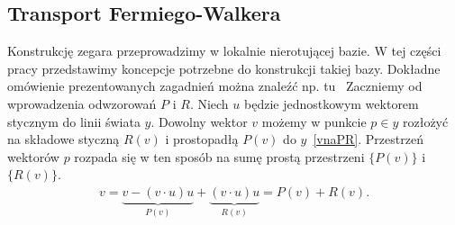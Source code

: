 \subsection{Transport Fermiego-Walkera}
Konstrukcję zegara przeprowadzimy w lokalnie nierotującej bazie. W tej części
pracy przedstawimy koncepcje potrzebne do konstrukcji takiej bazy. Dokładne 
omówienie prezentowanych zagadnień można znaleźć np. 
tu~\cite{synge1960, FWframesconstruct}
Zaczniemy od wprowadzenia odwzorowań $P$ i $R$. Niech $u$ będzie jednostkowym
wektorem stycznym do linii świata $y$. Dowolny wektor $v$ możemy w punkcie 
$p\in y$ rozłożyć na składowe styczną $R(v)$ i prostopadłą $P(v)$ 
do $y$~\eqref{vnaPR}. Przestrzeń wektorów $p$ rozpada się w ten sposób 
na sumę prostą przestrzeni $\{P(v)\}$ i $\{R(v)\}$.
\begin{align}\label{vnaPR}
v = \underbrace{v - (v\cdot u) u}_{P(v)} + 
\underbrace{(v\cdot u)u}_{R(v)} = P(v) + R(v).
\end{align}


